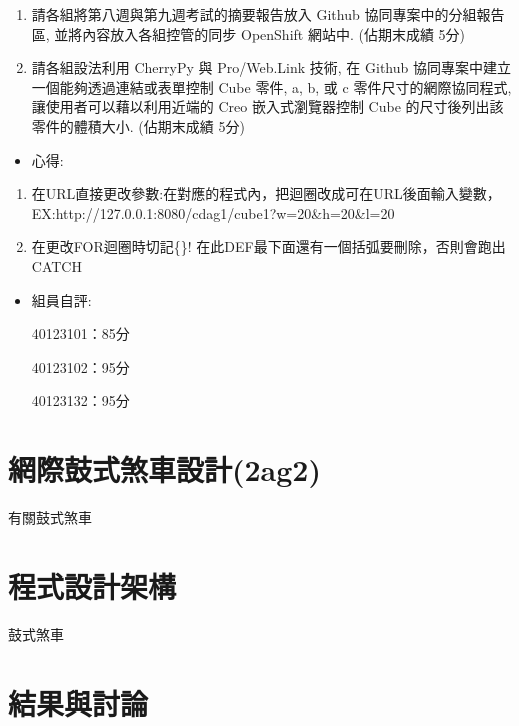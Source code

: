 \documentclass[]{article}
\begin{document}
\begin{enumerate}
\def\labelenumi{\arabic{enumi}.}
\itemsep1pt\parskip0pt
\item
  請各組將第八週與第九週考試的摘要報告放入 Github
  協同專案中的分組報告區, 並將內容放入各組控管的同步 OpenShift 網站中.
  (佔期末成績 5分)
\item
  請各組設法利用 CherryPy 與 Pro/Web.Link 技術, 在 Github
  協同專案中建立一個能夠透過連結或表單控制 Cube 零件, a, b, 或 c
  零件尺寸的網際協同程式, 讓使用者可以藉以利用近端的 Creo
  嵌入式瀏覽器控制 Cube 的尺寸後列出該零件的體積大小. (佔期末成績 5分)
\end{enumerate}

\begin{itemize}
\itemsep1pt\parskip0pt
\item
  心得:
\end{itemize}

\begin{enumerate}
\def\labelenumi{\arabic{enumi}.}
\itemsep1pt\parskip0pt
\item
  在URL直接更改參數:在對應的程式內，把迴圈改成可在URL後面輸入變數，EX:http://127.0.0.1:8080/cdag1/cube1?w=20\&h=20\&l=20
\item
  在更改FOR迴圈時切記\{\}!
  在此DEF最下面還有一個括弧要刪除，否則會跑出CATCH
\end{enumerate}

\begin{itemize}
\item
  組員自評:

  40123101：85分

  40123102：95分

  40123132：95分
\end{itemize}

\section{網際鼓式煞車設計(2ag2)}\label{ux7db2ux969bux9f13ux5f0fux715eux8ecaux8a2dux8a082ag2}

有關鼓式煞車

\section{程式設計架構}\label{ux7a0bux5f0fux8a2dux8a08ux67b6ux69cb}

鼓式煞車

\section{結果與討論}\label{ux7d50ux679cux8207ux8a0eux8ad6}
\end{document}
